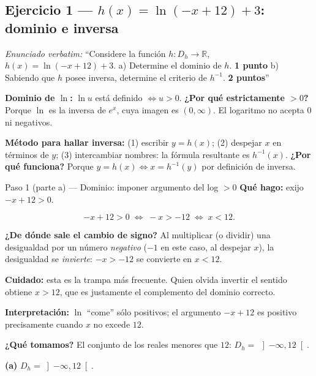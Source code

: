 \documentclass[11pt]{article}
\begin{document}
\subsection*{Ejercicio 1 --- $h(x)=\ln(-x+12)+3$: dominio e inversa}

\textit{Enunciado verbatim:} ``Considere la función $h:D_h\to\mathbb{R}$, $h(x)=\ln(-x+12)+3$.
a) Determine el dominio de $h$. \textbf{1 punto}
b) Sabiendo que $h$ posee inversa, determine el criterio de $h^{-1}$. \textbf{2 puntos}''

\begin{teo}
\textbf{Dominio de $\ln$:} $\ln u$ está definido $\Leftrightarrow u>0$. \textbf{¿Por qué estrictamente $>0$?} Porque $\ln$ es la inversa de $e^x$, cuya imagen es $(0,\infty)$. El logaritmo no acepta $0$ ni negativos.

\textbf{Método para hallar inversa:} (1) escribir $y=h(x)$; (2) despejar $x$ en términos de $y$; (3) intercambiar nombres: la fórmula resultante es $h^{-1}(x)$. \textbf{¿Por qué funciona?} Porque $y=h(x)\Leftrightarrow x=h^{-1}(y)$ por definición de inversa.
\end{teo}

\begin{paso}{Paso 1 (parte a) --- Dominio: imponer argumento del log $>0$}
\textbf{Qué hago:} exijo $-x+12>0$.

\[
-x+12>0 \;\Longleftrightarrow\; -x>-12 \;\Longleftrightarrow\; x<12.
\]

\textbf{¿De dónde sale el cambio de signo?} Al multiplicar (o dividir) una desigualdad por un número \emph{negativo} ($-1$ en este caso, al despejar $x$), la desigualdad se \emph{invierte}: $-x>-12$ se convierte en $x<12$.

\textbf{Cuidado:} esta es la trampa más frecuente. Quien olvida invertir el sentido obtiene $x>12$, que es justamente el complemento del dominio correcto.

\textbf{Interpretación:} $\ln$ ``come'' sólo positivos; el argumento $-x+12$ es positivo precisamente cuando $x$ no excede $12$.

\textbf{¿Qué tomamos?} El conjunto de los reales menores que $12$: $D_h=\,\left]-\infty,12\right[$.
\end{paso}

\begin{resp}
\textbf{(a)} $D_h=\left]-\infty,12\right[$.
\end{resp}
\end{document}

